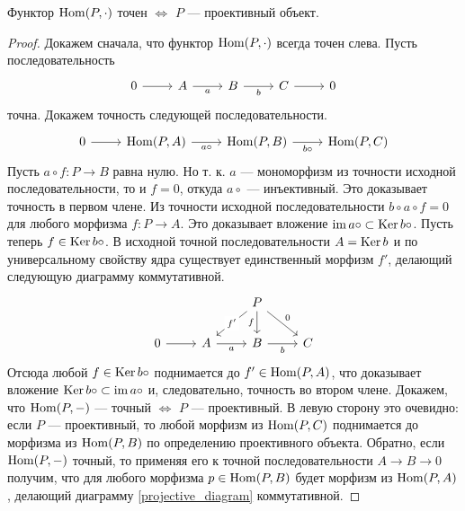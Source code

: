 \documentclass[../main.tex]{subfiles}
\begin{document}
\begin{to_suj}\label{home_exact_proj}
Функтор $\operatorname{Hom}(P, \cdot)$ точен $\iff$ $P$ --- проективный объект.
\end{to_suj}
\begin{proof}
Докажем сначала, что функтор $\operatorname{Hom}(P, \cdot)$ всегда точен слева. Пусть последовательность
\begin{equation*}
    \begin{tikzcd}
	0 & A & B & C & 0
	\arrow[from=1-1, to=1-2]
	\arrow["a"', from=1-2, to=1-3]
	\arrow["b"', from=1-3, to=1-4]
	\arrow[from=1-4, to=1-5]
\end{tikzcd}
\end{equation*}
точна. Докажем точность следующей последовательности.
\begin{equation*}
    \begin{tikzcd}
	0 & {\Hom(P, A)} & {\Hom(P, B)} & {\Hom(P, C)}
	\arrow[from=1-1, to=1-2]
	\arrow["b\circ"', from=1-3, to=1-4]
	\arrow["a\circ"', from=1-2, to=1-3]
\end{tikzcd}
\end{equation*}
 Пусть $a\circ f:P\to B$ равна нулю. Но т. к. $a$ --- мономорфизм из точности исходной последовательности, то и $f=0$, откуда $a\circ$ --- инъективный. Это доказывает точность в первом члене.
Из точности исходной последовательности $b\circ a \circ f = 0$ для любого морфизма $f:P\to A$. Это доказывает вложение $\mathop{\mathrm{im}}\nolimits a\circ \subset \mathop{\mathrm{Ker}}\nolimits b\circ$. Пусть теперь $f \in \mathop{\mathrm{Ker}}\nolimits b\circ$. В исходной точной последовательности $A = \mathop{\mathrm{Ker}}\nolimits b$ и по универсальному свойству ядра существует единственный морфизм $f'$, делающий следующую диаграмму коммутативной.
 \begin{equation}\label{projective_diagram}
     \begin{tikzcd}
	&& P \\
	0 & A & B & C
	\arrow["f"', from=1-3, to=2-3]
	\arrow["b"', from=2-3, to=2-4]
	\arrow["a"', from=2-2, to=2-3]
	\arrow["{f'}"{description}, from=1-3, to=2-2]
	\arrow[from=2-1, to=2-2]
	\arrow["0", from=1-3, to=2-4]
\end{tikzcd}
 \end{equation}
Отсюда любой $f\in \mathop{\mathrm{Ker}}\nolimits b\circ$ поднимается до $f' \in \operatorname{Hom}(P, A)$, что доказывает вложение $\mathop{\mathrm{Ker}}\nolimits b\circ \subset \mathop{\mathrm{im}}\nolimits a\circ$ и, следовательно, точность во втором члене.
Докажем, что $\operatorname{Hom}(P, -)$ --- точный $\iff$ $P$ --- проективный. В левую сторону это очевидно: если $P$ --- проективный, то любой морфизм из $\operatorname{Hom} (P, C)$ поднимается до морфизма из $\operatorname{Hom} (P, B)$ по определению проективного объекта. Обратно, если $\operatorname{Hom}(P, -)$ точный, то применяя его к точной последовательности $A\to B \to 0$ получим, что для любого морфизма $p\in \operatorname{Hom}(P, B)$ будет морфизм из $\operatorname{Hom}(P, A)$, делающий диаграмму \eqref{projective_diagram} коммутативной.
\end{proof}
\end{document}
